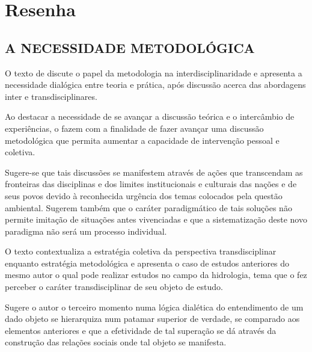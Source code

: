 \documentclass[
   article,       %
   12pt,          %
   oneside,       %
   a4paper,       %
   english,       %
   brazil,           %
   sumario=tradicional
   ]{abntex2}
\begin{document}

\frenchspacing 


\maketitle


\newpage

\textual
\section{Resenha}

\subsection{A NECESSIDADE METODOLÓGICA}

O texto de \cite{Paradigma_Transdisciplinar_Metodologica} discute o papel da metodologia na interdisciplinaridade e apresenta a necessidade dialógica entre teoria e prática, após discussão acerca das abordagens inter e transdisciplinares.

Ao destacar a necessidade de se avançar a discussão teórica e o intercâmbio de experiências, o fazem com a finalidade de fazer avançar uma discussão metodológica que permita aumentar a capacidade de intervenção pessoal e coletiva.

Sugere-se que tais discussões se manifestem através de ações que transcendam as fronteiras das disciplinas e dos limites institucionais e culturais das nações e de seus povos devido à reconhecida urgência dos temas colocados pela questão ambiental. Sugerem também que o caráter paradigmático de tais soluções não permite imitação de situações antes vivenciadas e que a sistematização deste novo paradigma não será um processo individual.

O texto contextualiza a estratégia coletiva da perspectiva transdisciplinar enquanto estratégia metodológica e apresenta o caso de estudos anteriores do mesmo autor o qual pode realizar estudos no campo da hidrologia, tema que o fez perceber o caráter transdisciplinar de seu objeto de estudo.

Sugere o autor o terceiro momento numa lógica dialética do entendimento de um dado objeto se hierarquiza num patamar superior de verdade, se comparado aos elementos anteriores e que a efetividade de tal superação se dá através da construção das relações sociais onde tal objeto se manifesta.
\end{document}
